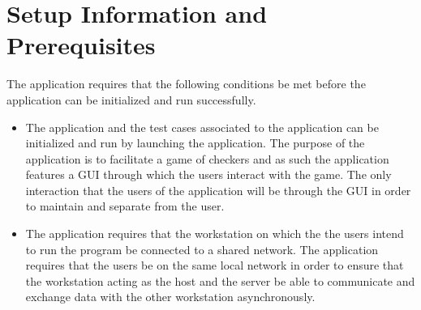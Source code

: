 \section{Setup Information and Prerequisites}
The application requires that the following conditions be met before the application 
can be initialized and run successfully. 

\begin{itemize}
 \item The application and the test cases associated to the application can be initialized and run 
by launching the application. The purpose of the application is to facilitate a game of checkers and 
as such the application features a GUI through which the users interact with the game. The only 
interaction that the users of the application will be through the GUI in order to maintain and separate 
from the user. 
\item The application requires that the workstation on which the the users intend 
to run the program be connected to a shared network. The application requires that the users be on the same
 local network in order to ensure that the workstation acting as the host and the server be able to communicate
 and exchange data with the other workstation asynchronously.
\end{itemize}
